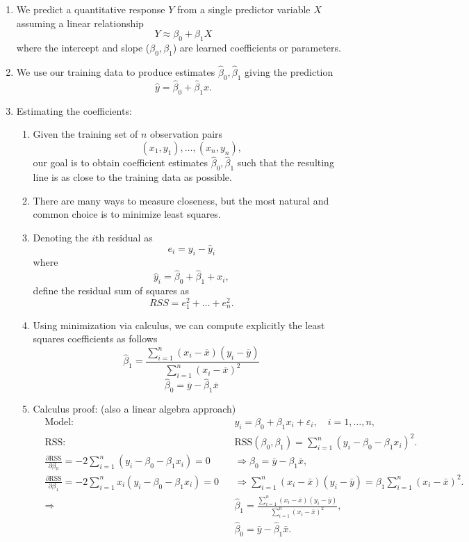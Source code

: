 \documentclass{article}
\begin{document}
\begin{enumerate}
\item We predict a quantitative response $Y$ from a single predictor variable $X$ assuming a linear relationship
\[
Y \approx \beta_0 + \beta_1 X
\]
where the intercept and slope ($\beta_0, \beta_1$) are learned coefficients or parameters.

\item We use our training data to produce estimates $\hat{\beta}_0, \hat{\beta}_1$ giving the prediction
\[
\hat{y} = \hat{\beta}_0 + \hat{\beta}_1 x.
\]

\item Estimating the coefficients:
\begin{enumerate}
\item Given the training set of $n$ observation pairs
\[
(x_1, y_1), \dots , (x_n, y_n),
\]
our goal is to obtain coefficient estimates $\hat{\beta}_0, \hat{\beta}_1$ such that the resulting line is as close to the training data as possible. 
\item There are many ways to measure closeness, but the most natural and common choice is to minimize least squares.
\item Denoting the $i$th residual as 
\[
e_i = y_i - \hat{y}_i
\]
where
\[
\hat{y}_i = \hat{\beta}_0 + \hat{\beta}_1 + x_i,
\]
define the residual sum of squares as
\[
RSS = e_1^2 + \dots + e_n^2.
\]
\item Using minimization via calculus, we can compute explicitly the least squares coefficients as follows
\[
\hat{\beta}_1 = \frac{\sum_{i=1}^n (x_i - \overline{x})(y_i - \overline{y})}{\sum_{i=1}^n (x_i - \overline{x})^2}
\]\[
\hat{\beta}_0 = \overline{y}-\hat{\beta}_1\overline{x}
\]
\item Calculus proof: (also a linear algebra approach)
\begin{align*}
&\text{Model:} && y_i = \beta_0 + \beta_1 x_i + \varepsilon_i, \quad i = 1,\dots,n, \\[2pt]
&\text{RSS:} && \mathrm{RSS}(\beta_0,\beta_1) = \sum_{i=1}^n (y_i - \beta_0 - \beta_1 x_i)^2. \\[4pt]
&\frac{\partial \mathrm{RSS}}{\partial \beta_0} = -2 \sum_{i=1}^n (y_i - \beta_0 - \beta_1 x_i) = 0 
&&\Rightarrow \beta_0 = \bar{y} - \beta_1 \bar{x}, \\[4pt]
&\frac{\partial \mathrm{RSS}}{\partial \beta_1} = -2 \sum_{i=1}^n x_i (y_i - \beta_0 - \beta_1 x_i) = 0
&&\Rightarrow \sum_{i=1}^n (x_i - \bar{x})(y_i - \bar{y}) = \beta_1 \sum_{i=1}^n (x_i - \bar{x})^2. \\[4pt]
&\Rightarrow && \hat{\beta}_1 = \frac{\sum_{i=1}^n (x_i - \bar{x})(y_i - \bar{y})}{\sum_{i=1}^n (x_i - \bar{x})^2}, \\[4pt]
& && \hat{\beta}_0 = \bar{y} - \hat{\beta}_1 \bar{x}.
\end{align*}


\end{enumerate}
\end{enumerate}
\end{document}
